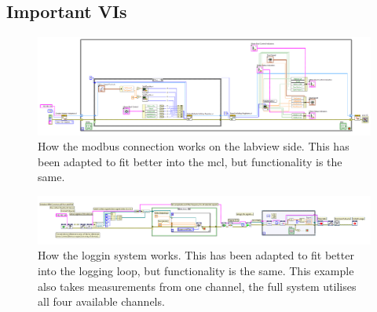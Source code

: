 \subsection{Important VIs}
\begin{figure}[H]
    \centering
    \includegraphics[width=0.75\linewidth]{vis/ModbusIO.PNG}
    \caption{How the modbus connection works on the labview side. This has been adapted to fit better into the \acrshort{mcl}, but functionality is the same.}
    \label{fig:ModbusIO}
\end{figure}

\begin{figure}[H]
    \centering
    \includegraphics[width=0.75\linewidth]{vis/LoggingSystem.PNG}
    \caption{How the loggin system works. This has been adapted to fit better into the logging loop, but functionality is the same. This example also takes measurements from one channel, the full system utilises all four available channels.}
    \label{fig:Logging}
\end{figure}